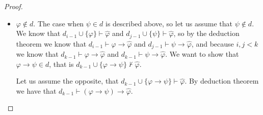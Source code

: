 \documentclass{article}
\theoremstyle{definition}
\theoremstyle{definition}
\theoremstyle{definition}
\newcommand*{\ra}{\rightarrow}
\begin{document}
\begin{proof}
\begin{itemize}
\begin{itemize}
                        Let us assume the opposite, that $d_{k-1} \cup \{\varphi \ra \psi\} \vdash
                            \hat{\varphi}$. By the deduction theorem we have that $d_{k-1} \vdash (\varphi
                            \ra \psi) \ra \hat{\varphi}$. Let $\Psi$ be the proof of $(\varphi \ra \psi)
                            \ra \hat{\varphi}$ in $d_{k-1}$. Let us append to $\Psi$ a formula $((\varphi
                            \ra \psi) \ra \hat{\varphi}) \ra (\psi \ra \hat{\varphi})$. Then by modus
                        ponens we can infer $\psi \ra \hat{\varphi}$, so we have a proof of $\psi \ra
                            \hat{\varphi}$ in $d_{k-1}$. By the deduction theorem $d_{k-1} \cup \{\psi\}
                            \vdash \hat{\varphi}$. But we know that $\psi \in d_{j-1}$ and because $d_{j-1}
                            \subseteq d_{k-1}$, we know that $d_{k-1} \cup \{\psi\} = d_{k-1}$. So we have
                        arrived at $d_{k-1} \vdash \hat{\varphi}$, which is a contradiction. So we know
                        that $d_{k-1} \cup \{\varphi \ra \psi\} \not \vdash \hat{\varphi}$ so $\varphi
                            \ra \psi \in d$.

                  \item $\varphi \not \in d$. The case when $\psi \in d$ is described above, so let us assume that $\psi \not \in d$. We know that $d_{i-1} \cup \{\varphi\} \vdash \hat{\varphi}$ and $d_{j-1} \cup \{\psi\} \vdash \hat{\varphi}$, so by the deduction theorem we know that $d_{i-1} \vdash \varphi \ra \hat{\varphi}$ and $d_{j-1} \vdash \psi \ra \hat{\varphi}$, and because $i, j < k$ we know that $d_{k-1} \vdash \varphi \ra \hat{\varphi}$ and $d_{k-1} \vdash \psi \ra \hat{\varphi}$. We want to show that $\varphi \ra \psi \in d$, that is $d_{k-1} \cup \{\varphi \ra \psi\} \not \vdash \hat{\varphi}$.

                        Let us assume the opposite, that $d_{k-1} \cup \{\varphi \ra \psi\} \vdash
                            \hat{\varphi}$. By deduction theorem we have that $d_{k-1} \vdash (\varphi \ra
                            \psi) \ra \hat{\varphi}$.


\end{itemize}
\end{itemize}
\end{proof}
\end{document}
